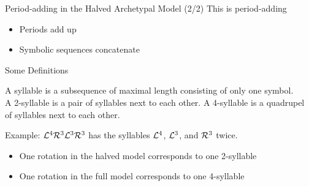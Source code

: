 \begin{frame}{Period-adding in the Halved Archetypal Model (2/2)}
	This is period-adding
	\begin{itemize}
		\item Periods add up
		\item Symbolic sequences concatenate
	\end{itemize}
	\pause
	\vspace{1em}
	\begin{center}
	\end{center}
\end{frame}

\begin{frame}{Some Definitions}
	\vspace{-1em}
	\begin{definition}[Syllables]
		A syllable is a subsequence of maximal length consisting of only one symbol. \\[1em]
		A 2-syllable is a pair of syllables next to each other.
		A 4-syllable is a quadrupel of syllables next to each other.
	\end{definition}
	\pause
	Example: $\mathcal{L}^4\mathcal{R}^3\mathcal{L}^3\mathcal{R}^3$ has the syllables $\mathcal{L}^4$, $\mathcal{L}^3$, and $\mathcal{R}^3$ twice.
	\vspace{1em}
	\begin{itemize}
		\pause
		\item One rotation in the halved model corresponds to one 2-syllable
		\item One rotation in the full model corresponds to one 4-syllable
	\end{itemize}
\end{frame}

